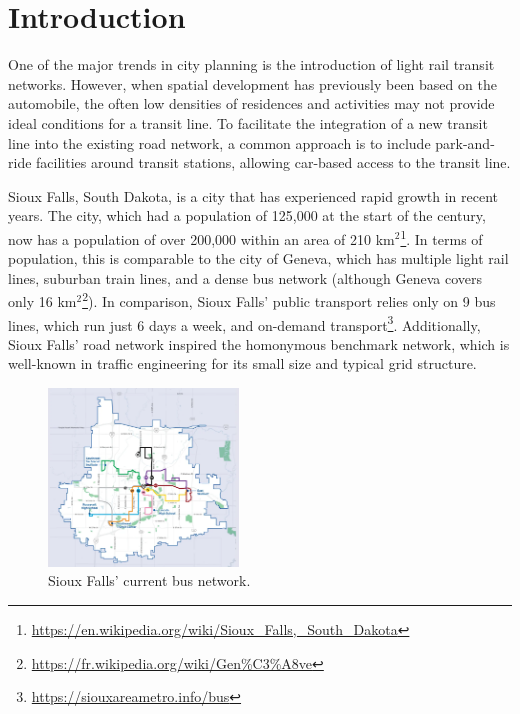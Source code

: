 \section{Introduction}

One of the major trends in city planning is the introduction of light rail transit networks. However, when spatial development has previously been based on the automobile, the often low densities of residences and activities may not provide ideal conditions for a transit line. To facilitate the integration of a new transit line into the existing road network, a common approach is to include park-and-ride facilities around transit stations, allowing car-based access to the transit line.

Sioux Falls, South Dakota, is a city that has experienced rapid growth in recent years. The city, which had a population of 125,000 at the start of the century, now has a population of over 200,000 within an area of 210 km$^2$\footnote{\url{https://en.wikipedia.org/wiki/Sioux_Falls,_South_Dakota}}. In terms of population, this is comparable to the city of Geneva, which has multiple light rail lines, suburban train lines, and a dense bus network (although Geneva covers only 16 km$^2$\footnote{\url{https://fr.wikipedia.org/wiki/Gen\%C3\%A8ve}}). In comparison, Sioux Falls' public transport relies only on 9 bus lines, which run just 6 days a week, and on-demand transport\footnote{\url{https://siouxareametro.info/bus}}. Additionally, Sioux Falls' road network inspired the homonymous benchmark network, which is well-known in traffic engineering for its small size and typical grid structure.

\begin{figure}
    \centering
    \includegraphics[keepaspectratio,width=0.45\textwidth]{Figures/siouxfalls_bus_network.png}
    \caption{Sioux Falls' current bus network.}
    \label{fig:sioux_falls_bus_network}
\end{figure}

